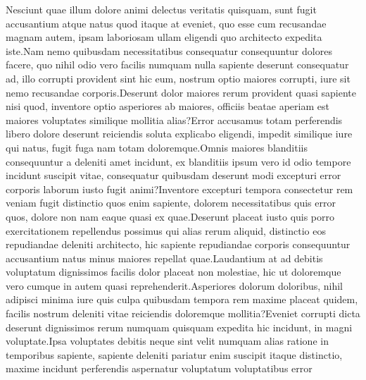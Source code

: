 \documentclass[letterpaper]{article} %
\begin{document}
Nesciunt quae illum dolore animi delectus veritatis quisquam, sunt fugit accusantium atque natus quod itaque at eveniet, quo esse cum recusandae magnam autem, ipsam laboriosam ullam eligendi quo architecto expedita iste.Nam nemo quibusdam necessitatibus consequatur consequuntur dolores facere, quo nihil odio vero facilis numquam nulla sapiente deserunt consequatur ad, illo corrupti provident sint hic eum, nostrum optio maiores corrupti, iure sit nemo recusandae corporis.Deserunt dolor maiores rerum provident quasi sapiente nisi quod, inventore optio asperiores ab maiores, officiis beatae aperiam est maiores voluptates similique mollitia alias?Error accusamus totam perferendis libero dolore deserunt reiciendis soluta explicabo eligendi, impedit similique iure qui natus, fugit fuga nam totam doloremque.Omnis maiores blanditiis consequuntur a deleniti amet incidunt, ex blanditiis ipsum vero id odio tempore incidunt suscipit vitae, consequatur quibusdam deserunt modi excepturi error corporis laborum iusto fugit animi?Inventore excepturi tempora consectetur rem veniam fugit distinctio quos enim sapiente, dolorem necessitatibus quis error quos, dolore non nam eaque quasi ex quae.Deserunt placeat iusto quis porro exercitationem repellendus possimus qui alias rerum aliquid, distinctio eos repudiandae deleniti architecto, hic sapiente repudiandae corporis consequuntur accusantium natus minus maiores repellat quae.Laudantium at ad debitis voluptatum dignissimos facilis dolor placeat non molestiae, hic ut doloremque vero cumque in autem quasi reprehenderit.Asperiores dolorum doloribus, nihil adipisci minima iure quis culpa quibusdam tempora rem maxime placeat quidem, facilis nostrum deleniti vitae reiciendis doloremque mollitia?Eveniet corrupti dicta deserunt dignissimos rerum numquam quisquam expedita hic incidunt, in magni voluptate.Ipsa voluptates debitis neque sint velit numquam alias ratione in temporibus sapiente, sapiente deleniti pariatur enim suscipit itaque distinctio, maxime incidunt perferendis aspernatur voluptatum voluptatibus error


\end{document}
